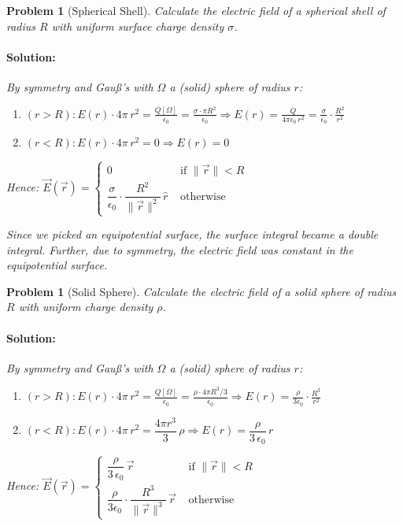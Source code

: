 \documentclass[12pt]{article}
\let\RA\Rightarrow
\newcommand*{\rv}{\vec{r}}
\newcommand*{\rhat}{\hat{r}}
\newcommand*{\vE}{\vec{E}}
\newcommand*{\ee}{\epsilon_0}
\newtheorem{problem}[theorem]{Problem}
\newenvironment{solution}{\paragraph{Solution:}}{\hfill}
\begin{document}
\begin{problem}[Spherical Shell]
  Calculate the electric field of a spherical shell of radius $R$ with uniform surface charge density $\sigma$.
  \begin{solution}
    By symmetry and Gauß's with $\Omega$ a (solid) sphere of radius $r$:
    \begin{enumerate}
      \item $\displaystyle (r>R):E(r)\cdot 4\pi\,r^2=\frac{Q[\Omega]}{\ee}=\frac{\sigma\cdot\pi R^2}{\ee}\RA E(r)=\frac{Q}{4\pi\ee\,r^2}=\frac{\sigma}{\ee}\cdot\frac{R^2}{r^2}$
      \item $\displaystyle (r<R):E(r)\cdot 4\pi\,r^2=0\RA E(r)=0$
    \end{enumerate}
    Hence: $\displaystyle \vE(\rv)=\begin{cases}
      0 &\text{ if }\|\rv\|<R\\\dfrac{\sigma}{\ee}\cdot\dfrac{R^2}{\|\rv\|^2}\,\rhat&\text{ otherwise}
    \end{cases}$

    \noindent Since we picked an equipotential surface, the surface integral became a double integral. Further, due to symmetry, the electric field was constant in the equipotential surface.
  \end{solution}
\end{problem}

\begin{problem}[Solid Sphere]
  Calculate the electric field of a solid sphere of radius $R$ with uniform charge density $\rho$.
  \begin{solution}
    By symmetry and Gauß's with $\Omega$ a (solid) sphere of radius $r$:
    \begin{enumerate}
      \item $\displaystyle (r>R):E(r)\cdot 4\pi\,r^2=\frac{Q[\Omega]}{\ee}=\frac{\rho\cdot 4\pi R^3/3}{\ee}\RA E(r)=\frac{\rho}{3\ee}\cdot\frac{R^3}{r^2}$
      \item $\displaystyle (r<R):E(r)\cdot 4\pi\,r^2=\dfrac{4\pi r^3}{3}\,\rho\RA E(r)=\dfrac{\rho}{3\,\ee}\,r$
    \end{enumerate}
    Hence: $\displaystyle \vE(\rv)=\begin{cases}
      \dfrac{\rho}{3\,\ee}\,\rv &\text{ if }\|\rv\|<R\\\dfrac{\rho}{3\ee}\cdot\dfrac{R^3}{\|\rv\|^3}\,\rv&\text{ otherwise}
    \end{cases}$
  \end{solution}
\end{problem}
\end{document}
